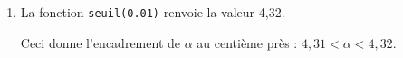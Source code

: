 \begin{enumerate}
\begin{enumerate}
$\bullet~~$sur $]0~;~\alpha[, \: f(x) < 0$ ;

$\bullet~~$sur $]\alpha~;~+ \infty[, \: f(x) > 0$ ;

$\bullet~~$$f(\alpha) = 0$.
	\end{enumerate}
\item %

%

La fonction \texttt{seuil(0.01)} renvoie la valeur 4,32.

Ceci donne l'encadrement de $\alpha$ au centième près :
$4,31 < \alpha < 4,32$.
\end{enumerate}

\bigskip

